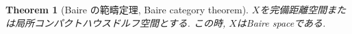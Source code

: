 \documentclass[dvipdfmx,a4paper,11pt]{article} %
\newtheorem{thm}{Theorem}[section]
\theoremstyle{definition}
\theoremstyle{remark}
\numberwithin{equation}{section}
\begin{document}
\begin{tcolorbox}[mybox]
\begin{thm}[Baire の範疇定理, Baire category theorem]
$X$を完備距離空間または局所コンパクトハウスドルフ空間とする. 
この時, $X$はBaire spaceである. 
\end{thm}
\end{tcolorbox}


\begin{comment}

結論：
少なくとも一つの \(F_n\) は内部が空でない（内部に開集合を含む）。

言い換え：
- 完備距離空間は「第1類集合（meagre set）」の可算和では覆えない。
- 「第1類集合」とは、内部が空な閉集合の可算和のこと。

\textbf{位相空間論的形}

より一般に：  
\(X\) が局所コンパクトハウスドルフ空間かつ Baire 空間であるなら、任意の可算個の稠密開集合の交わりは稠密である：
\[
\bigcap_{n=1}^\infty U_n \ \text{は稠密}, \quad U_n \ \text{稠密開集合}.
\]
バナッハ空間や完備距離空間は Baire 空間の例。

\textbf{Banach–Steinhaus との関係}  
Banach–Steinhaus（一様有界性原理）は、この Baire の類別定理を使って証明されます。

ざっくり言うと：
1. 点ごとの有界性 \(\Rightarrow\) 「大きさがある閾値を超えない集合」が可算和で \(X\) を覆う。
2. Baire の類別定理により、その中の1つが内部を持つ。
3. 線形性と連続性を使って、内部がある集合の条件が空間全体に広がる。
4. これにより作用素ノルムが一様有界になる。

\section*{全体像}

\subsection*{1. Baireの類別定理（Baire category theorem）}
\textbf{主張}：
完全距離空間（バナッハ空間，フレシェ空間など）はBaire空間．

すなわち：
\begin{itemize}
\item nowhere dense（内部が空な閉集合）の可算和では空間全体を覆えない．
\item 稠密開集合の可算交わりは稠密．
\end{itemize}

\subsection*{2. フレシェ空間は第2類}
\begin{itemize}
\item フレシェ空間は「局所凸＋距離化可能＋完備」な位相ベクトル空間．
\item よって完備距離空間 $\Rightarrow$ Baire空間 $\Rightarrow$ 第1類ではない $\Rightarrow$ 第2類．
\end{itemize}


\end{comment}
\end{document}
